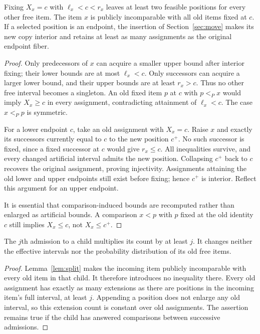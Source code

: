 \begin{lemma}
\label{lem:split}
Fixing $X_x=c$ with $\ell_x<c<r_x$ leaves at least two feasible positions for
every other free item. The item $x$ is publicly incomparable with all old
items fixed at $c$.
If a selected position is an endpoint, the insertion of
Section~\ref{sec:move} makes its new copy interior and retains at least as
many assignments as the original endpoint fiber.
\end{lemma}
\begin{proof}
Only predecessors of $x$ can acquire a smaller upper bound after interior
fixing; their lower bounds are at most $\ell_x<c$. Only successors can
acquire a larger lower bound, and their upper bounds are at least $r_x>c$.
Thus no other free interval becomes a singleton.
An old fixed item $p$ at $c$ with $p<_P x$ would imply $X_x\geq c$
in every assignment, contradicting attainment of $\ell_x<c$.
The case $x<_P p$ is symmetric.

For a lower endpoint $c$, take an old assignment with $X_x=c$.
Raise $x$ and exactly its successors currently equal to $c$ to the new
position $c^+$. No such successor is fixed, since a fixed successor at
$c$ would give $r_x\leq c$. All inequalities survive, and every changed
artificial interval admits the new position. Collapsing $c^+$ back to $c$
recovers the original assignment, proving injectivity. Assignments attaining
the old lower and upper endpoints still exist before fixing; hence $c^+$
is interior. Reflect this argument for an upper endpoint.

It is essential that comparison-induced bounds are recomputed rather than
enlarged as artificial bounds. A comparison $x<p$ with $p$ fixed at the old
identity $c$ still implies $X_x\leq c$, not $X_x\leq c^+$.
\end{proof}

\begin{lemma}
\label{lem:birth}
The $j$th admission to a child multiplies its count by at least $j$.
It changes neither the effective intervals nor the probability distribution
of its old free items.
\end{lemma}
\begin{proof}
Lemma~\ref{lem:split} makes the incoming item publicly incomparable with
every old item in that child. It therefore introduces no inequality there.
Every old assignment has exactly as many extensions as there are positions
in the incoming item's full interval, at least $j$. Appending a position
does not enlarge any old interval, so this extension count is constant
over old assignments. The assertion remains true if the child has answered
comparisons between successive admissions.
\end{proof}

